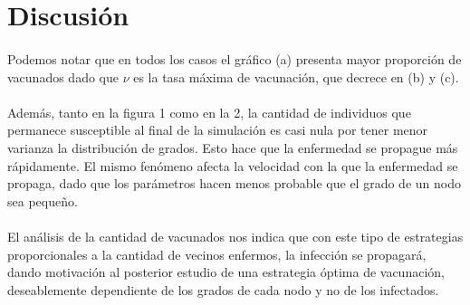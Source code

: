 \documentclass[10pt,a4paper]{article}
\begin{document}
\section*{Discusi\'on}
\paragraph{}
Podemos notar que en todos los casos el gr\'afico (a) presenta mayor proporci\'on de vacunados dado que $\nu$ es la tasa m\'axima de vacunaci\'on, que decrece en (b) y (c).

\paragraph{}
Adem\'as, tanto en la figura 1 como en la 2, la cantidad de individuos que permanece susceptible al final de la simulaci\'on es casi nula por tener menor varianza la distribuci\'on de grados. Esto hace que la enfermedad se propague m\'as r\'apidamente. El mismo fen\'omeno afecta la velocidad con la que la enfermedad se propaga, dado que los par\'ametros hacen menos probable que el grado de un nodo sea peque\~no.

\paragraph{}
El an\'alisis de la cantidad de vacunados nos indica que con este tipo de estrategias proporcionales a la cantidad de vecinos enfermos, la infecci\'on se propagar\'a, dando motivaci\'on al posterior estudio de una estrategia \'optima de vacunaci\'on, deseablemente dependiente de los grados de cada nodo y no de los infectados.
\end{document}

